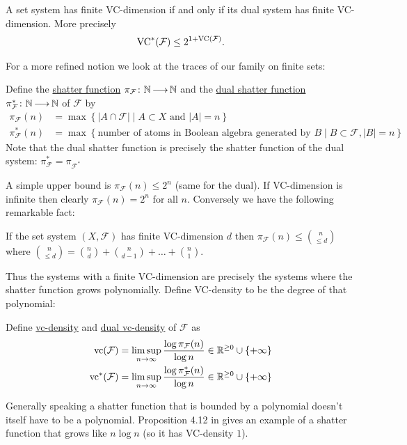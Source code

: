 \documentclass{amsart}
\newcommand{\F}{\mathcal F}
\newcommand{\curly}[1]{\left\{#1\right\}}
\newcommand{\defn}{\underline}
\begin{document}
\begin{Lemma}
  A set system has finite VC-dimension if and only if its dual system has finite VC-dimension.
  More precisely
  \begin{align*}
    \VC^*(\F) \leq 2^{1+\VC(\F)}.
  \end{align*}
\end{Lemma}

For a more refined notion we look at the traces of our family on finite sets:
\begin{Definition}
  Define the \defn{shatter function} $\pi_\F \colon \N \arr \N$ and the \defn{dual shatter function} $\pi^*_\F \colon \N \arr \N$ of $\F$ by 
  \begin{align*}
    \pi_\F(n) &= \max \curly{|A \cap \F| \mid A \subset X \text{ and } |A| = n} \\
    \pi^*_\F(n) &= \max \curly{\text{number of atoms in Boolean algebra generated by $B$} \mid B \subset \F, |B| = n}
  \end{align*}
  Note that the dual shatter function is precisely the shatter function of the dual system: $\pi^*_\F = \pi_{\F^*}$
\end{Definition}  

A simple upper bound is $\pi_\F(n) \leq 2^n$ (same for the dual).
If VC-dimension is infinite then clearly $\pi_\F(n) = 2^n$ for all $n$. Conversely we have the following remarkable fact:
\begin{Theorem} 
  If the set system $(X, \F)$ has finite VC-dimension $d$ then $\pi_\F(n) \leq {n \choose \leq d}$ where
  ${n \choose \leq d} = {n \choose d} + {n \choose d - 1} + \ldots + {n \choose 1}$.    
\end{Theorem}

Thus the systems with a finite VC-dimension are precisely the systems where the shatter function grows polynomially.
Define VC-density to be the degree of that polynomial:
\begin{Definition}
  Define \defn{vc-density} and \defn{dual vc-density} of $\F$ as
  \begin{align*}
    \vc(\F) &= \limsup_{n \to \infty}\frac{\log \pi_\F(n)}{\log n} \in \R^{\geq 0} \cup \curly{+\infty}\\
    \vc^*(\F) &= \limsup_{n \to \infty}\frac{\log \pi^*_\F(n)}{\log n}\in \R^{\geq 0} \cup \curly{+\infty}
  \end{align*}
\end{Definition}

Generally speaking a shatter function that is bounded by a polynomial doesn't itself have to be a polynomial.
Proposition 4.12 in \cite{density} gives an example of a shatter function that grows like $n \log n$ (so it has VC-density $1$).
\end{document}
